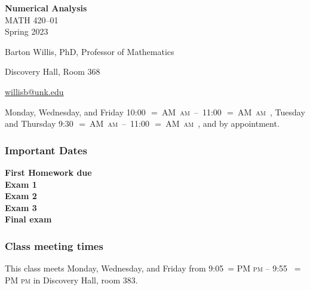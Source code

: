 \documentclass[12pt,fullpage]{article}
\makeatletter
\newcounter{ex}\setcounter{ex}{0}
\newenvironment{mypar}[2]
  {\begin{list}{}%
    {\setlength\leftmargin{#1}
    \setlength\rightmargin{#2}}
    \item[]}
  {\end{list}}
\renewenvironment{description}[0]{\begin{compactdesc}}{\end{compactdesc}}
\DeclareRobustCommand{\maybefakesc}[1]{%
  \ifnum\pdfstrcmp{\f@series}{\bfdefault}=\z@
    {\fontsize{\dimexpr0.8\dimexpr\f@size pt\relax}{0}\selectfont\uppercase{#1}}%
  \else
    \textsc{#1}%
  \fi
}
\newcommand\AM{\,\maybefakesc{am}\xspace}
\newcommand\PM{\,\maybefakesc{pm}\xspace}
\newcommand{\coursename}{Numerical Analysis}
\newcommand{\coursenumber}{MATH 420}
\newcommand{\sectionnumber}{01}
\newcommand{\term}{Spring }
\newcommand{\room}{Discovery Hall, room  383}
\newcommand{\meetingtime}{This class meets Monday, Wednesday, and Friday  from 
	9:05\PM{}  --  9:55 \PM}
\newcommand{\ay}{2023}
\newcommand{\officehours}{ Monday, Wednesday, and Friday \mbox{10:00\AM{} -- 11:00\AM},
    Tuesday and Thursday \mbox{9:30\AM -- 11:00\AM}, and by appointment.}
\makeatother
\begin{document}
\cleanlookdateon%
\shortdate
\printyearoff
\large
\begin{center}
    \textbf{\coursename}  \\
    {\coursenumber--\sectionnumber} \\
     {\term \ay} \\
\end{center}

\vskip0.25in
\normalsize

\begin{center}
    \begin{description}
        \item[Instructor:] Barton Willis, PhD, Professor of Mathematics
        \item[Office:]  Discovery Hall, Room 368
        \item[\phone:]   
        \item[\Email:]    \href{mailto:willisb@unk.edu}{willisb@unk.edu}
        \item[Office Hours:] \officehours
      \end{description}
    \end{center}

    \subsubsection*{Important Dates}

\begin{mypar}{0.25in}{0.25in} 

      \textbf{First Homework due} \dotfill  \textbf{}  \\
       \textbf{Exam 1} \dotfill \textbf{}  \\
    \textbf{Exam 2} \dotfill  \textbf{} \\
    \textbf{Exam 3} \dotfill \textbf{} \\
         \textbf{Final exam} \dotfill  \textbf{}
\end{mypar}
    \subsubsection*{Class meeting times}

\meetingtime{} in \room.
\end{document}

